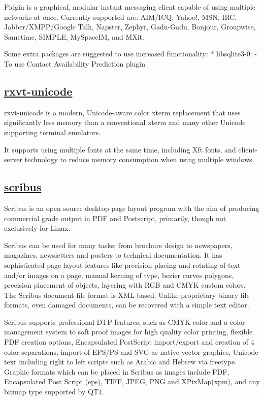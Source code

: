  Pidgin is a graphical, modular instant messaging client capable of using
 multiple networks at once. Currently supported are:
 AIM/ICQ, Yahoo!, MSN, IRC, Jabber/XMPP/Google Talk, Napster, Zephyr, Gadu-Gadu,
 Bonjour, Groupwise, Sametime, SIMPLE, MySpaceIM, and MXit.
 
 Some extra packages are suggested to use increased functionality:
  * libsqlite3-0:
    - To use Contact Availability Prediction plugin

\subsection{\href{http://software.schmorp.de/pkg/rxvt-unicode.html}{rxvt-unicode}}

 rxvt-unicode is a modern, Unicode-aware color xterm replacement that uses
 significantly less memory than a conventional xterm and many other Unicode
 supporting terminal emulators.
 
 It supports using multiple fonts at the same time, including Xft fonts, and
 client-server technology to reduce memory consumption when using multiple
 windows.

\subsection{\href{http://www.scribus.net}{scribus}}

 Scribus is an open source desktop page layout program with the aim of
 producing commercial grade output in PDF and Postscript, primarily, though
 not exclusively for Linux.
 
 Scribus can be used for many tasks; from brochure design to newspapers,
 magazines, newsletters and posters to technical documentation. It has
 sophisticated page layout features like precision placing and rotating of text
 and/or images on a page, manual kerning of type, bezier curves polygons,
 precision placement of objects, layering with RGB and CMYK custom colors. The
 Scribus document file format is XML-based. Unlike proprietary binary file
 formats, even damaged documents, can be recovered with a simple text editor.
 
 Scribus supports professional DTP features, such as CMYK color and a
 color management system to soft proof images for high quality color printing,
 flexible PDF creation options, Encapsulated PostScript import/export and
 creation of 4 color separations, import of EPS/PS and SVG as native vector
 graphics, Unicode text including right to left scripts such as Arabic and
 Hebrew via freetype. Graphic formats which can be placed in Scribus as images
 include PDF, Encapsulated Post Script (eps), TIFF, JPEG, PNG and XPixMap(xpm),
 and any bitmap type supported by QT4.
 
